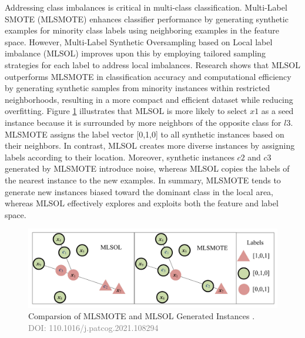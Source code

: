 Addressing class imbalances is critical in multi-class classification. Multi-Label SMOTE (MLSMOTE) \cite{charte2015mlsmote} enhances classifier performance by generating synthetic examples for minority class labels using neighboring examples in the feature space. However, Multi-Label Synthetic Oversampling based on Local label imbalance (MLSOL) \cite{liu2022multi} improves upon this by employing tailored sampling strategies for each label to address local imbalances. Research shows that MLSOL outperforms MLSMOTE in classification accuracy and computational efficiency by generating synthetic samples from minority instances within restricted neighborhoods, resulting in a more compact and efficient dataset while reducing overfitting. Figure \ref{fig:mlsmote_mlsol} illustrates that MLSOL is more likely to select $x1$ as a seed instance because it is surrounded by more neighbors of the opposite class for $l3$. MLSMOTE assigns the label vector [0,1,0] to all synthetic instances based on their neighbors. In contrast, MLSOL creates more diverse instances by assigning labels according to their location. Moreover, synthetic instances $c2$ and $c3$ generated by MLSMOTE introduce noise, whereas MLSOL copies the labels of the nearest instance to the new examples. In summary, MLSMOTE tends to generate new instances biased toward the dominant class in the local area, whereas MLSOL effectively explores and exploits both the feature and label space.
\begin{figure}[!ht]

    \begin{center}
      \includegraphics[width=1\textwidth]{3_State-of-the-art/fig/mlsmote_mlsol.png}
    \end{center}

    \caption{Comparsion of MLSMOTE and MLSOL Generated Instances \cite{liu2022multi}.\\ \textcolor{gray}{\fontsize{10}{0}\selectfont DOI: 110.1016/j.patcog.2021.108294}}
    \label{fig:mlsmote_mlsol}

    \end{figure}
    
